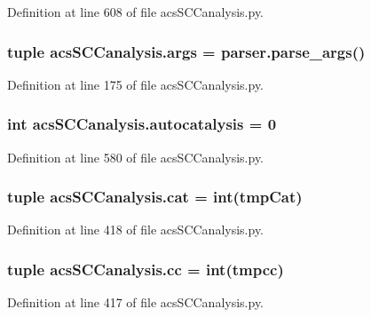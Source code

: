 Definition at line 608 of file acs\-S\-C\-Canalysis.\-py.

\hypertarget{a00097_aa0fabce811f34f18ba6ecbdd5bcbab6a}{
\subsubsection[{args}]{\setlength{\rightskip}{0pt plus 5cm}tuple acs\-S\-C\-Canalysis.\-args = parser.\-parse\-\_\-args()}}\label{a00097_aa0fabce811f34f18ba6ecbdd5bcbab6a}


Definition at line 175 of file acs\-S\-C\-Canalysis.\-py.

\hypertarget{a00097_a70ccd5d519e878c6c8a7d0aa73caf46c}{
\subsubsection[{autocatalysis}]{\setlength{\rightskip}{0pt plus 5cm}int acs\-S\-C\-Canalysis.\-autocatalysis = 0}}\label{a00097_a70ccd5d519e878c6c8a7d0aa73caf46c}


Definition at line 580 of file acs\-S\-C\-Canalysis.\-py.

\hypertarget{a00097_aea872e34fe0da6302f6195f1b2315148}{
\subsubsection[{cat}]{\setlength{\rightskip}{0pt plus 5cm}tuple acs\-S\-C\-Canalysis.\-cat = int(tmp\-Cat)}}\label{a00097_aea872e34fe0da6302f6195f1b2315148}


Definition at line 418 of file acs\-S\-C\-Canalysis.\-py.

\hypertarget{a00097_a67fcb77a15f51e94c98bb48b05865715}{
\subsubsection[{cc}]{\setlength{\rightskip}{0pt plus 5cm}tuple acs\-S\-C\-Canalysis.\-cc = int(tmpcc)}}\label{a00097_a67fcb77a15f51e94c98bb48b05865715}


Definition at line 417 of file acs\-S\-C\-Canalysis.\-py.

